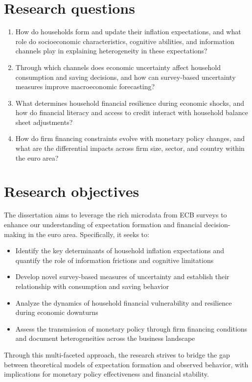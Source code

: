 \documentclass[11pt,a4paper]{article}
\begin{document}
\section*{Research questions}
\begin{enumerate}[label=\textbf{RQ\arabic*.}, wide=0pt]
    \item How do households form and update their inflation expectations, and what role do socioeconomic characteristics, cognitive abilities, and information channels play in explaining heterogeneity in these expectations?
    \item Through which channels does economic uncertainty affect household consumption and saving decisions, and how can survey-based uncertainty measures improve macroeconomic forecasting?
    \item What determines household financial resilience during economic shocks, and how do financial literacy and access to credit interact with household balance sheet adjustments?
    \item How do firm financing constraints evolve with monetary policy changes, and what are the differential impacts across firm size, sector, and country within the euro area?
\end{enumerate}

\section*{Research objectives}
The dissertation aims to leverage the rich microdata from ECB surveys to enhance our understanding of expectation formation and financial decision-making in the euro area. Specifically, it seeks to:
\begin{itemize}[wide=0pt]
    \item Identify the key determinants of household inflation expectations and quantify the role of information frictions and cognitive limitations
    \item Develop novel survey-based measures of uncertainty and establish their relationship with consumption and saving behavior
    \item Analyze the dynamics of household financial vulnerability and resilience during economic downturns
    \item Assess the transmission of monetary policy through firm financing conditions and document heterogeneities across the business landscape
\end{itemize}
Through this multi-faceted approach, the research strives to bridge the gap between theoretical models of expectation formation and observed behavior, with implications for monetary policy effectiveness and financial stability.
\end{document}
